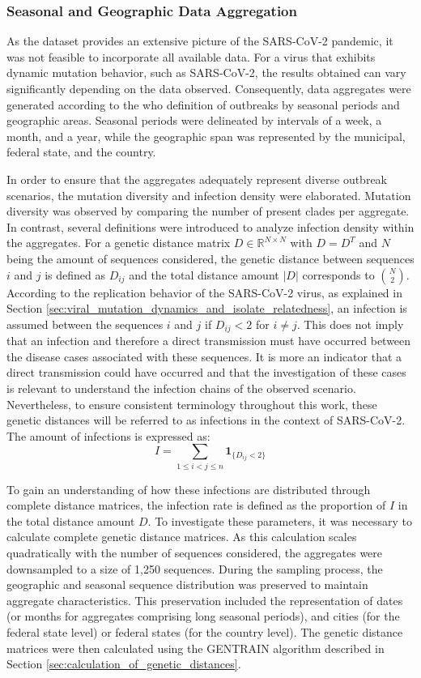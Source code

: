 \subsubsection{Seasonal and Geographic Data Aggregation}
\label{sec:seasonal_and_geographical_data_aggregation}
As the dataset provides an extensive picture of the SARS-CoV-2 pandemic, it was not feasible to incorporate all available data. For a virus that exhibits dynamic mutation behavior, such as SARS-CoV-2, the results obtained can vary significantly depending on the data observed. Consequently, data aggregates were generated according to the \acrshort{who} definition of outbreaks by seasonal periods and geographic areas. Seasonal periods were delineated by intervals of a week, a month, and a year, while the geographic span was represented by the municipal, federal state, and the country.

In order to ensure that the aggregates adequately represent diverse outbreak scenarios, the mutation diversity and infection density were elaborated. Mutation diversity was observed by comparing the number of present clades per aggregate. In contrast, several definitions were introduced to analyze infection density within the aggregates.
For a genetic distance matrix $D \in \mathbb{R}^{N \times N}$ with $D = D^T$ and $N$ being the amount of sequences considered, the genetic distance between sequences $i$ and $j $ is defined as $D_{ij}$ and the total distance amount $|D|$ corresponds to $\binom{N}{2}$. According to the replication behavior of the SARS-CoV-2 virus, as explained in Section \ref{sec:viral_mutation_dynamics_and_isolate_relatedness}, an infection is assumed between the sequences $i$ and $j$ if $D_{ij} < 2$ for $i \neq j$. This does not imply that an infection and therefore a direct transmission must have occurred between the disease cases associated with these sequences. It is more an indicator that a direct transmission could have occurred and that the investigation of these cases is relevant to understand the infection chains of the observed scenario. Nevertheless, to ensure consistent terminology throughout this work, these genetic distances will be referred to as infections in the context of SARS-CoV-2. The amount of infections is expressed as:
$$I = \sum_{1 \le i < j \le n} \mathbf{1}_{\{D_{ij} < 2\}}$$

To gain an understanding of how these infections are distributed through complete distance matrices, the infection rate is defined as the proportion of $I$ in the total distance amount $D$. To investigate these parameters, it was necessary to calculate complete genetic distance matrices. As this calculation scales quadratically with the number of sequences considered, the aggregates were downsampled to a size of 1,250 sequences. During the sampling process, the geographic and seasonal sequence distribution was preserved to maintain aggregate characteristics. This preservation included the representation of dates (or months for aggregates comprising long seasonal periods), and cities (for the federal state level) or federal states (for the country level). The genetic distance matrices were then calculated using the GENTRAIN algorithm described in Section \ref{sec:calculation_of_genetic_distances}.

